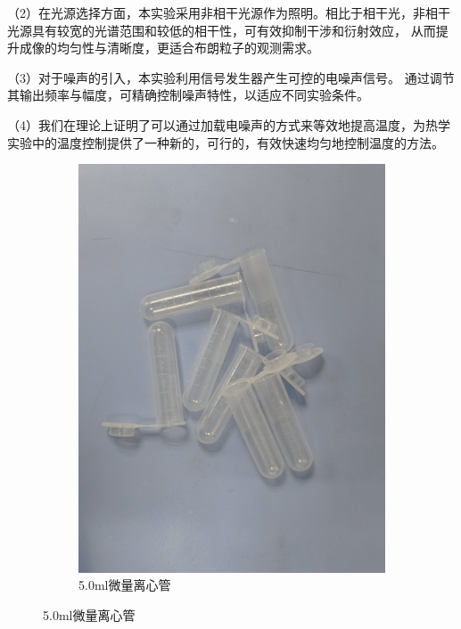\documentclass[a4paper]{report} %
\begin{document}
（2）在光源选择方面，本实验采用非相干光源作为照明。相比于相干光，非相干光源具有较宽的光谱范围和较低的相干性，可有效抑制干涉和衍射效应，
从而提升成像的均匀性与清晰度，更适合布朗粒子的观测需求\cite{goodman,mandel1995optical}。\par

（3）对于噪声的引入，本实验利用信号发生器产生可控的电噪声信号。
通过调节其输出频率与幅度，可精确控制噪声特性，以适应不同实验条件\cite{horowitz1989art,schreiber1999electrical}。\par

（4）我们在理论上证明了可以通过加载电噪声的方式来等效地提高温度，为热学实验中的温度控制提供了一种新的，可行的，有效快速均匀地控制温度的方法。
\begin{figure}[H]
    \centering
    \begin{subfigure}{0.22\textwidth}
        \includegraphics[width=\linewidth]{5.0ml微量离心管.jpg}
        \caption{5.0ml微量离心管}
    \end{subfigure}

\end{figure}
\end{document}
